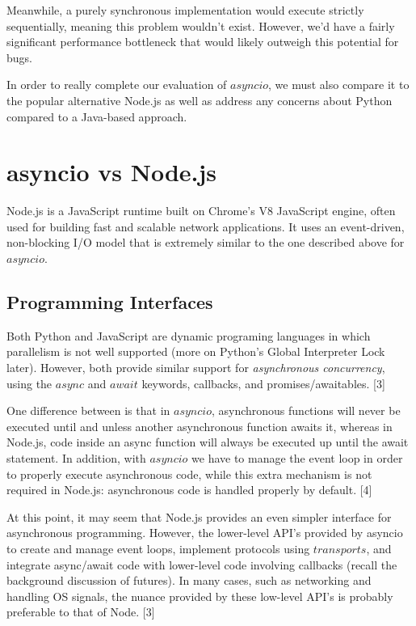 Meanwhile, a purely synchronous implementation would execute strictly sequentially, meaning this problem wouldn't exist. However, we'd have a 
fairly significant performance bottleneck that would likely outweigh this potential for bugs. 

In order to really complete our evaluation of $asyncio$, we must also compare it to the popular alternative Node.js as well as address any concerns
about Python compared to a Java-based approach. 

\section{asyncio vs Node.js}
Node.js is a JavaScript runtime built on Chrome's V8 JavaScript engine, often used for building fast and scalable network applications.
It uses an event-driven, non-blocking I/O model that is extremely similar to the one described above for $asyncio$.

\subsection{Programming Interfaces}
Both Python and JavaScript are dynamic programing languages in which parallelism is not well supported (more on Python's Global Interpreter Lock later). 
However, both provide similar support for \emph{asynchronous concurrency}, using the $async$ and $await$ keywords, callbacks, and promises/awaitables. [3]

One difference between is that in $asyncio$, asynchronous functions will never be executed until and unless another asynchronous 
function awaits it, whereas in Node.js, code inside an async function will always be executed up until the await statement. In addition, with $asyncio$ we have to manage
the event loop in order to properly execute asynchronous code, while this extra mechanism is not required in Node.js: asynchronous code is handled properly by default. [4]

At this point, it may seem that Node.js provides an even simpler interface for asynchronous programming. However, the lower-level API's 
provided by asyncio to create and manage event loops, implement protocols using $transports$, and integrate async/await code with lower-level code involving 
callbacks (recall the background discussion of futures). In many cases, such as networking and handling OS signals, the nuance provided by 
these low-level API's is probably preferable to that of Node. [3]

